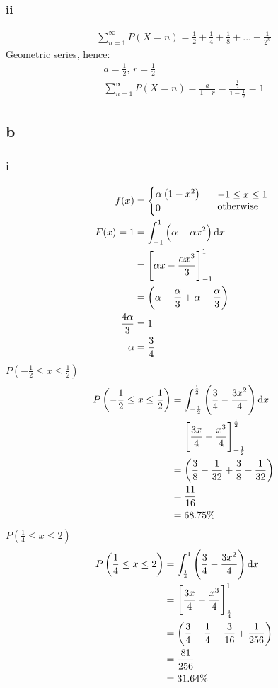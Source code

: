 \documentclass[11pt]{article}
\numberwithin{equation}{section}
\begin{document}
\subsubsection{ii}
\begin{gather}
    \sum_{n=1}^{\infty} P(X=n) = \frac{1}{2} + \frac{1}{4} + \frac{1}{8} + ... + \frac{1}{2^n}
\end{gather}
Geometric series, hence:
\begin{gather}
    a = \frac{1}{2}, \, r = \frac{1}{2}\\
    \sum_{n=1}^{\infty} P(X=n) = \frac{a}{1-r} = \frac{\frac{1}{2}}{1-\frac{1}{2}} = 1
\end{gather}
\subsection{b}
\subsubsection{i}
\begin{align}
    f(x) &= \begin{cases}
        \alpha \left(1 - x^2\right)\\
        0 
    \end{cases} \begin{array}{l}
        -1 \leq x \leq 1\\
        \textrm{otherwise}
    \end{array}\\
    F(x) = 1 &= \int_{-1}^1 \left(\alpha - \alpha x^2\right) \dif x\\
    &= \left[\alpha x - \frac{\alpha x^3}{3}\right]_{-1}^{1}\\
    &= \left(\alpha - \frac{\alpha}{3} + \alpha -\frac{\alpha}{3} \right)\\
    \frac{4\alpha}{3} &= 1\\
    \alpha &= \frac{3}{4}
\end{align}
$P\left(-\frac{1}{2} \leq x \leq \frac{1}{2} \right)$
\begin{align}
    P\left(-\frac{1}{2} \leq x \leq \frac{1}{2} \right) &= \int_{-\frac{1}{2}}^{\frac{1}{2}} \left(\frac{3}{4} - \frac{3x^2}{4}\right) \dif x\\
    &= \left[\frac{3x}{4} - \frac{x^3}{4}\right]_{-\frac{1}{2}}^{\frac{1}{2}}\\
    &= \left(\frac{3}{8} - \frac{1}{32} + \frac{3}{8} - \frac{1}{32} \right)\\
    &= \frac{11}{16}\\
    &= 68.75\%
\end{align}
$P\left(\frac{1}{4} \leq x \leq 2 \right)$
\begin{align}
    P\left(\frac{1}{4} \leq x \leq 2 \right) &= \int_{\frac{1}{4}}^{1} \left(\frac{3}{4} - \frac{3x^2}{4}\right) \dif x\\
    &= \left[\frac{3x}{4} - \frac{x^3}{4}\right]_{\frac{1}{4}}^{1}\\
    &= \left(\frac{3}{4} - \frac{1}{4} - \frac{3}{16} + \frac{1}{256} \right)\\
    &= \frac{81}{256}\\
    &= 31.64\%
\end{align}
\end{document}
